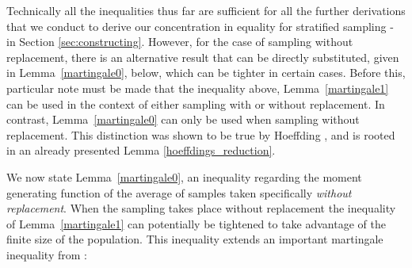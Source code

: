 Technically all the inequalities thus far are sufficient for all the further derivations that we conduct to derive our concentration in equality for stratified sampling - in Section \ref{sec:constructing}. 
However, for the case of sampling without replacement, there is an alternative result that can be directly substituted, given in Lemma~\ref{martingale0}, below, which can be tighter in certain cases.
Before this, particular note must be made that the inequality above, Lemma~\ref{martingale1} can be used in the context of either sampling with or without replacement.
In contrast, Lemma~\ref{martingale0} can only be used when sampling without replacement. 
This distinction was shown to be true by Hoeffding \cite{hoeffding1}, and is rooted in an already presented Lemma \ref{hoeffdings_reduction}.

We now state Lemma~\ref{martingale0}, an inequality regarding the moment generating function of the average of samples taken specifically \textit{without replacement}.
When the sampling takes place without replacement the inequality of Lemma~\ref{martingale1} can potentially be tightened to take advantage of the finite size of the population.
This inequality extends an important martingale inequality from \cite{bardenet2015}:

